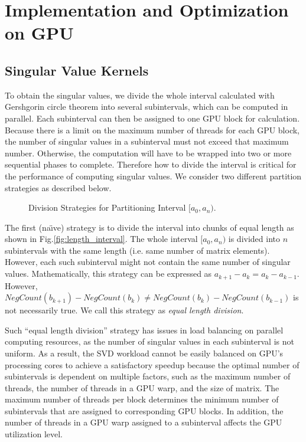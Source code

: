 \vspace{-0.1in}
\section{Implementation and Optimization on GPU} \label{sec:implementation}
\vspace{-0.1in}
\subsection{Singular Value Kernels} \label{sec_svalue}
\vspace{-0.1in}
To obtain the singular values, we divide the whole interval calculated with Gershgorin circle theorem into several subintervals, which can be computed in parallel.
Each subinterval can then be assigned to one GPU block for calculation.
Because there is a limit on the maximum number of threads for each GPU block,
the number of singular values in a subinterval must not exceed that maximum number. Otherwise, the computation will have to be wrapped into two or more sequential phases to complete.
Therefore how to divide the interval is critical for the performance of
computing singular values. We consider two different partition
strategies as described below. 
\begin{figure}[hbpt]
\vspace{-0.3in}
\centering
\vspace{-0.1in}
  \caption{Division Strategies for Partitioning Interval  $[a_0, a_n)$.}
\vspace{-0.3in}
\end{figure}

The first (na\"{\i}ve) strategy is to divide the interval into chunks of equal length as shown in Fig.\ref{fig:length_interval}.
The whole interval $[a_0, a_n)$ is divided into $n$ subintervals with
the same length (i.e. same number of matrix elements). However, each
such subinterval might not contain the same number of singular values.
Mathematically, this strategy can be expressed as
$a_{k+1}-a_k = a_{k}-a_{k-1}$. However, $NegCount(b_{k+1})-NegCount(b_{k}) \ne NegCount(b_{k})-NegCount(b_{k-1})$ is not necessarily true. We call this strategy as {\it equal length division}.

Such ``equal length division'' strategy has issues in load balancing on 
parallel computing resources, as the number of singular values in each
subinterval is not uniform. As a result,
the SVD workload cannot be easily balanced on GPU's processing cores to achieve a satisfactory speedup because the optimal number of subintervals is dependent on multiple factors, such as the maximum number of threads, the number of threads in a GPU warp, and the size of matrix.
The maximum number of threads per block determines the minimum number
of subintervals that are assigned to corresponding GPU blocks.
In addition, the number of threads in a GPU warp assigned to a subinterval affects the GPU utilization level.

